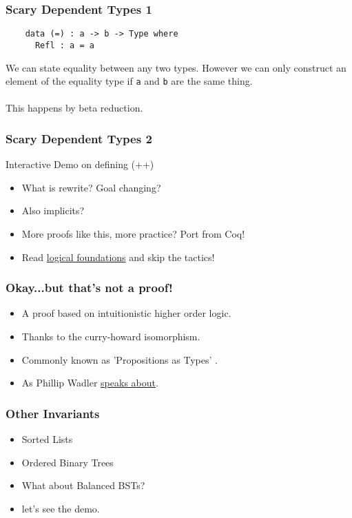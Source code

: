 \documentclass[hyperref={colorlinks = true,linkcolor = blue, citecolor = blue, urlcolor = blue}]{beamer}
\begin{document}
\begin{frame}[fragile]
  \frametitle{Scary Dependent Types 1}
  \begin{verbatim}
    data (=) : a -> b -> Type where
      Refl : a = a
  \end{verbatim}
  We can state equality between any two types. However we can only construct
  an element of the equality type if \texttt{a} and \texttt{b}
  are the same thing. \\ \\
  This happens by beta reduction.
\end{frame}

\begin{frame}[fragile]
  \frametitle{Scary Dependent Types 2}
  Interactive Demo on defining (++)
\end{frame}

\begin{frame}[fragile]
  \begin{itemize}
    \item What is rewrite? Goal changing?
    \item Also implicits?
    \item More proofs like this, more practice? Port from Coq!
    \item Read \href{https://softwarefoundations.cis.upenn.edu/lf-current/toc.html}{logical foundations} and
           skip the tactics!
  \end{itemize}
\end{frame}

\begin{frame}[fragile]
  \frametitle{Okay...but that's not a proof!}
    \begin{itemize}
      \item A proof based on intuitionistic higher order logic.
      \item Thanks to the curry-howard isomorphism.
      \item Commonly known as 'Propositions as Types' \citep{wadler2015propositions}.
      \item As Phillip Wadler \href{https://www.youtube.com/watch?v=IOiZatlZtGU}{speaks about}.
    \end{itemize}
\end{frame}

\begin{frame}[fragile]
  \frametitle{Other Invariants}
  \begin{itemize}
    \item Sorted Lists
    \item Ordered Binary Trees
    \item What about Balanced BSTs?
    \item let's see the demo.
  \end{itemize}
\end{frame}
\end{document}
